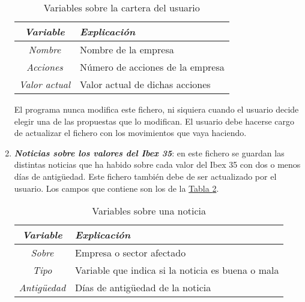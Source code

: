\documentclass[11pt,openany]{book} %
\begin{document}
\begin{enumerate}[\color{ocre}{$\bullet$}]
    \begin{table}[!h]
    \centering
    {
    \begin{tabular}{|c|p{8cm}|}
    \hline
    \textcolor{ocre}{\textit{\textbf{Variable}}} & \textcolor{ocre}{\textit{\textbf{Explicación}}} \\
    \hline
    \textit{Nombre} & Nombre de la empresa \\
    \hline
    \textit{Acciones} & Número de acciones de la empresa \\
    \hline
    \textit{Valor actual} & Valor actual de dichas acciones \\
    \hline
    \end{tabular}
    }
    \caption{Variables sobre la cartera del usuario}
    \label{valorcartera}
    \end{table}

    El programa nunca modifica este fichero, ni siquiera cuando el usuario decide elegir una de las propuestas que lo modifican. El usuario debe hacerse cargo de actualizar el fichero con los movimientos que vaya haciendo.

    \item \textit{\textbf{\textcolor{ocre}{Noticias sobre los valores del Ibex 35}}}: en este fichero se guardan las distintas noticias que ha habido sobre cada valor del Ibex 35 con dos o menos días de antigüedad. Este fichero también debe de ser actualizado por el usuario. Los campos que contiene son los de la \hyperref[valornoticia]{Tabla \ref*{valornoticia}}.

    \begin{table}[!h]
    \centering
    {
    \begin{tabular}{|c|p{8cm}|}
    \hline
    \textcolor{ocre}{\textit{\textbf{Variable}}} & \textcolor{ocre}{\textit{\textbf{Explicación}}} \\
    \hline
    \textit{Sobre} & Empresa o sector afectado \\
    \hline
    \textit{Tipo} & Variable que indica si la noticia es buena o mala \\
    \hline
    \textit{Antigüedad} & Días de antigüedad de la noticia \\
    \hline
    \end{tabular}
    }
    \caption{Variables sobre una noticia}
    \label{valornoticia}
    \end{table}

\end{enumerate}
\end{document}
